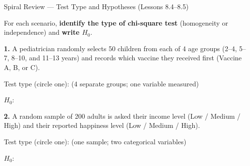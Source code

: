 \documentclass[10pt]{article}
\begin{document}
\namedateperiod

\vspace{0.12in}

\begin{notesbox}{Spiral Review --- Test Type and Hypotheses (Lessons 8.4--8.5)}

For each scenario, \textbf{identify the type of chi-square test} (homogeneity or independence)
and \textbf{write $H_0$}.

\bigskip

\textbf{1.} A pediatrician randomly selects 50 children from each of 4 age groups
(2--4, 5--7, 8--10, and 11--13 years) and records which vaccine they received first
(Vaccine A, B, or C).

\vspace{0.08in}
Test type (circle one): \quad {} \quad (4 separate groups; one variable measured)

\vspace{0.08in}
$H_0$: 

\vspace{0.15in}

\textbf{2.} A random sample of 200 adults is asked their income level
(Low / Medium / High) and their reported happiness level (Low / Medium / High).

\vspace{0.08in}
Test type (circle one): \quad {} \quad (one sample; two categorical variables)

\vspace{0.08in}
$H_0$: 

\end{notesbox}
\end{document}
